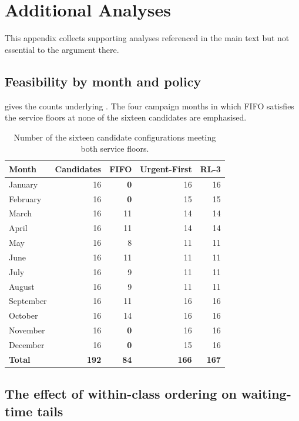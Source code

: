 \chapter{Additional Analyses}
\label{app:F}

This appendix collects supporting analyses referenced in the main text but not essential to the
argument there.

\section{Feasibility by month and policy}

 gives the counts underlying . The four campaign
months in which FIFO satisfies the service floors at none of the sixteen candidates are
emphasised.

\begin{table}[htbp]
\centering
\caption[Feasible configurations by month and policy]{Number of the sixteen candidate
configurations meeting both service floors.}
\label{tab:app-feasibility}
\small
\begin{tabular}{lrrrr}
\toprule
\textbf{Month} & \textbf{Candidates} & \textbf{FIFO} & \textbf{Urgent-First} & \textbf{RL-3} \\
\midrule
January   & 16 & \textbf{0} & 16 & 16 \\
February  & 16 & \textbf{0} & 15 & 15 \\
March     & 16 & 11 & 14 & 14 \\
April     & 16 & 11 & 14 & 14 \\
May       & 16 &  8 & 11 & 11 \\
June      & 16 & 11 & 11 & 11 \\
July      & 16 &  9 & 11 & 11 \\
August    & 16 &  9 & 11 & 11 \\
September & 16 & 11 & 16 & 16 \\
October   & 16 & 14 & 16 & 16 \\
November  & 16 & \textbf{0} & 16 & 16 \\
December  & 16 & \textbf{0} & 15 & 16 \\
\midrule
\textbf{Total} & \textbf{192} & \textbf{84} & \textbf{166} & \textbf{167} \\
\bottomrule
\end{tabular}
\end{table}

\section{The effect of within-class ordering on waiting-time tails}
\label{sec:app-tails}

